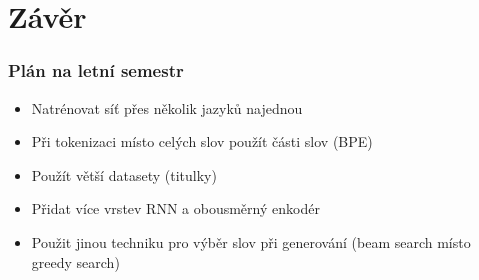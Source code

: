 \documentclass[pdf,fyma2]{beamer}
\begin{document}
\section{Závěr}

\begin{frame}
\frametitle{Plán na letní semestr}

     \begin{itemize}
        \item Natrénovat síť přes několik jazyků najednou
        \item Při tokenizaci místo celých slov použít části slov (BPE)
        \item Použít větší datasety (titulky)
        \item Přidat více vrstev RNN a obousměrný enkodér
        \item Použit jinou techniku pro výběr slov při generování (beam search místo greedy search)
    \end{itemize}
    
\end{frame}
\end{document}
